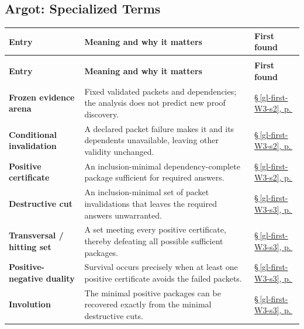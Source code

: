 \documentclass[11pt,letterpaper]{article}
\begin{document}
\subsection*{Argot: Specialized Terms}
\begingroup\small\setlength{\tabcolsep}{4pt}\renewcommand{\arraystretch}{1.16}
\begin{longtable}{@{}>{\raggedright\arraybackslash}p{.215\linewidth}>{\raggedright\arraybackslash}p{.585\linewidth}>{\raggedright\arraybackslash}p{.14\linewidth}@{}}
\toprule
\textbf{Entry} & \textbf{Meaning and why it matters} & \textbf{First found} \\
\midrule\endfirsthead
\multicolumn{3}{@{}l}{\footnotesize \emph{Argot: Specialized Terms (continued)}}\\
\toprule\textbf{Entry} & \textbf{Meaning and why it matters} & \textbf{First found} \\
\midrule\endhead
\bottomrule\endfoot
\textbf{Frozen evidence arena} & Fixed validated packets and dependencies; the analysis does not predict new proof discovery. & \hyperref[gl-first-W3-s2]{\S\,\ref*{gl-first-W3-s2}, p.\,\pageref*{gl-first-W3-s2}} \\
\textbf{Conditional invalidation} & A declared packet failure makes it and its dependents unavailable, leaving other validity unchanged. & \hyperref[gl-first-W3-s2]{\S\,\ref*{gl-first-W3-s2}, p.\,\pageref*{gl-first-W3-s2}} \\
\textbf{Positive certificate} & An inclusion-minimal dependency-complete package sufficient for required answers. & \hyperref[gl-first-W3-s2]{\S\,\ref*{gl-first-W3-s2}, p.\,\pageref*{gl-first-W3-s2}} \\
\textbf{Destructive cut} & An inclusion-minimal set of packet invalidations that leaves the required answers unwarranted. & \hyperref[gl-first-W3-s3]{\S\,\ref*{gl-first-W3-s3}, p.\,\pageref*{gl-first-W3-s3}} \\
\textbf{Transversal / hitting set} & A set meeting every positive certificate, thereby defeating all possible sufficient packages. & \hyperref[gl-first-W3-s3]{\S\,\ref*{gl-first-W3-s3}, p.\,\pageref*{gl-first-W3-s3}} \\
\textbf{Positive-negative duality} & Survival occurs precisely when at least one positive certificate avoids the failed packets. & \hyperref[gl-first-W3-s3]{\S\,\ref*{gl-first-W3-s3}, p.\,\pageref*{gl-first-W3-s3}} \\
\textbf{Involution} & The minimal positive packages can be recovered exactly from the minimal destructive cuts. & \hyperref[gl-first-W3-s3]{\S\,\ref*{gl-first-W3-s3}, p.\,\pageref*{gl-first-W3-s3}} \\

\end{longtable}
\end{document}

